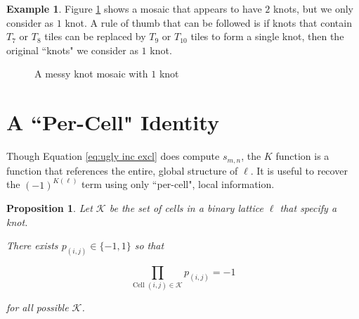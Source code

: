 \documentclass[12pt]{article}
\theoremstyle{plain}
\newtheorem{prop}[thm]{Proposition}
\theoremstyle{definition}
\theoremstyle{remark}
\theoremstyle{definition}
\newtheorem{exmp}{Example}[section]
\newcommand{\cell}[4]{ \draw[thick] ( #1 , #2 ) rectangle ( #3 , #4 );}
\newcommand{\cellA}[4]{\draw[red, thick, densely dotted] ( #1 + 0.5 , #2 ) arc(0:90:{0.5}); \draw[thick] ( #1 , #2 ) rectangle ( #3 , #4 );}
\newcommand{\cellB}[4]{\draw[red, thick, densely dotted] ( #1 + 1 , #2 + 0.5 ) arc(90:180:{0.5}); \draw[thick] ( #1 , #2 ) rectangle ( #3 , #4 );}
\newcommand{\cellC}[4]{\draw[red, thick, densely dotted] ( #1 + 0.5, #2 + 1 ) arc(180:270:{0.5}); \draw[thick] ( #1 , #2 ) rectangle ( #3 , #4 );}
\newcommand{\cellD}[4]{\draw[red, thick, densely dotted] ( #1 , #2 + 0.5 ) arc(-90:0:{0.5}); \draw[thick] ( #1 , #2 ) rectangle ( #3 , #4 );}
\newcommand{\cellE}[4]{\draw[red, thick, densely dotted] (#3, #4 * 0.5 + #2 * 0.5) -- (#1, #4 * 0.5 + #2 * 0.5); \draw[thick] ( #1 , #2 ) rectangle ( #3 , #4 );}
\newcommand{\cellF}[4]{\draw[red, thick, densely dotted] (#3 * 0.5 + #1 * 0.5 , #2) -- (#3 * 0.5 + #1 * 0.5 , #4); \draw[thick] ( #1 , #2 ) rectangle ( #3 , #4 );}
\newcommand{\cellG}[4]{\draw[red, thick, densely dotted] ( #1 + 0.5 , #2 ) arc(0:90:{0.5}); \draw[red, thick, densely dotted] ( #1 + 0.5, #2 + 1 ) arc(180:270:{0.5}); \draw[thick] ( #1 , #2 ) rectangle ( #3 , #4 );}
\newcommand{\cellH}[4]{\draw[red, thick, densely dotted] ( #1 , #2 + 0.5 ) arc(-90:0:{0.5}); \draw[red, thick, densely dotted] ( #1 + 1 , #2 + 0.5 ) arc(90:180:{0.5}); \draw[thick] ( #1 , #2 ) rectangle ( #3 , #4 );}
\newcommand{\cellI}[4]{\draw[red, thick, densely dotted] (#3 * 0.5 + #1 * 0.5 , #2) -- (#3 * 0.5 + #1 * 0.5 , #4); \node[shape=circle,draw=none,fill=white, inner sep=3pt,minimum size=5pt] (A) at ( #1 + 0.5 , #2 + 0.5 ) {}; \draw[red, thick, densely dotted] (#3, #4 * 0.5 + #2 * 0.5) -- (#1, #4 * 0.5 + #2 * 0.5); \draw[thick] ( #1 , #2 ) rectangle ( #3 , #4 );}
\newcommand{\cellAf}[4]{\filldraw[gray!40] ( #1 , #2 ) rectangle ( #3 , #4 ); \draw[red, thick, densely dotted] ( #1 + 0.5 , #2 ) arc(0:90:{0.5}); \draw[thick] ( #1 , #2 ) rectangle ( #3 , #4 );}
\newcommand{\cellBf}[4]{\filldraw[gray!40] ( #1 , #2 ) rectangle ( #3 , #4 ); \draw[red, thick, densely dotted] ( #1 + 1 , #2 + 0.5 ) arc(90:180:{0.5}); \draw[thick] ( #1 , #2 ) rectangle ( #3 , #4 );}
\newcommand{\cellCf}[4]{\filldraw[gray!40] ( #1 , #2 ) rectangle ( #3 , #4 ); \draw[red, thick, densely dotted] ( #1 + 0.5, #2 + 1 ) arc(180:270:{0.5}); \draw[thick] ( #1 , #2 ) rectangle ( #3 , #4 );}
\newcommand{\cellDf}[4]{\filldraw[gray!40] ( #1 , #2 ) rectangle ( #3 , #4 ); \draw[red, thick, densely dotted] ( #1 , #2 + 0.5 ) arc(-90:0:{0.5}); \draw[thick] ( #1 , #2 ) rectangle ( #3 , #4 );}
\newcommand{\cellFf}[4]{\filldraw[gray!40] ( #1 , #2 ) rectangle ( #3 , #4 ); \draw[red, thick, densely dotted] (#3 * 0.5 + #1 * 0.5 , #2) -- (#3 * 0.5 + #1 * 0.5 , #4); \draw[thick] ( #1 , #2 ) rectangle ( #3 , #4 );}
\newcommand{\cellHf}[4]{\filldraw[gray!40] ( #1 , #2 ) rectangle ( #3 , #4 ); \draw[red, thick, densely dotted] ( #1 , #2 + 0.5 ) arc(-90:0:{0.5}); \draw[red, thick, densely dotted] ( #1 + 1 , #2 + 0.5 ) arc(90:180:{0.5}); \draw[thick] ( #1 , #2 ) rectangle ( #3 , #4 );}
\begin{document}
\begin{exmp}
Figure \ref{fig:messy multi knot} shows a mosaic that appears to have $2$ knots, but we only consider as $1$ knot. A rule of thumb that can be followed is if knots that contain $T_7$ or $T_8$ tiles can be replaced by $T_9$ or $T_{10}$ tiles to form a single knot, then the original ``knots" we consider as $1$ knot.

\begin{figure}[h!]
\begin{center}


\end{center}
\caption{A messy knot mosaic with $1$ knot}
\label{fig:messy multi knot}
\end{figure}

\end{exmp}

\section{A ``Per-Cell" Identity}

Though Equation \ref{eq:ugly inc excl} does compute $s_{m,n}$, the $K$ function is a function that references the entire, global structure of $\ell$. It is useful to recover the $(-1)^{K(\ell)}$ term using only ``per-cell", local information.

\begin{prop}
    Let $\mathcal{K}$ be the set of cells in a binary lattice $\ell$ that specify a knot.
    
    There exists $p_{(i,j)} \in \{-1,1\}$ so that

    \begin{equation}
        \prod_{\text{Cell } (i,j) \in \mathcal{K}} p_{(i,j)} = -1
        \label{eq:neg prod knot condition}
    \end{equation}

    for all possible $\mathcal{K}$.
    \label{prop:neg prod prop}
\end{prop}
\end{document}
